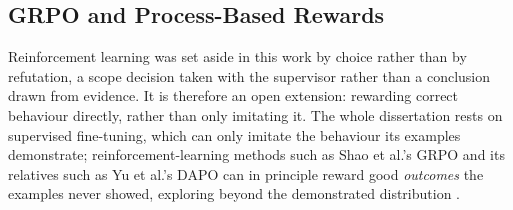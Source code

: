 
\subsection{GRPO and Process-Based Rewards}
\label{subsec:conclusion-future-grpo}

Reinforcement learning was set aside in this work by choice rather than by refutation, a scope decision taken with the supervisor rather than a conclusion drawn from evidence. It is therefore an open extension: rewarding correct behaviour directly, rather than only imitating it. The whole dissertation rests on supervised fine-tuning, which can only imitate the behaviour its examples demonstrate; reinforcement-learning methods such as Shao et al.'s GRPO and its relatives such as Yu et al.'s DAPO can in principle reward good \emph{outcomes} the examples never showed, exploring beyond the demonstrated distribution \cite{shao2024deepseekmathpushinglimitsmathematical, yu2025dapoopensourcellmreinforcement}.

